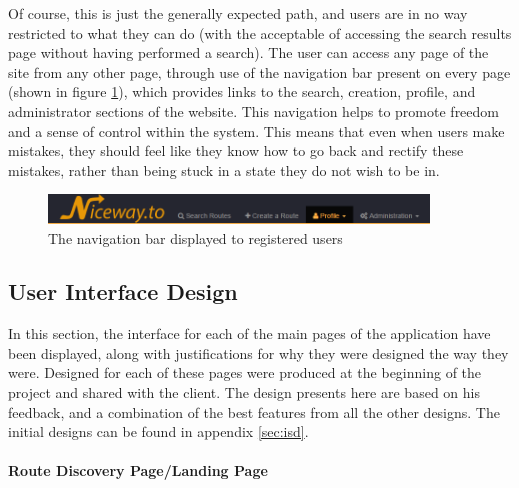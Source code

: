 \noindent
Of course, this is just the generally expected path, and users are in no way restricted to what they can do (with the acceptable of accessing the search results page without having performed a search). The user can access any page of the site from any other page, through use of the navigation bar present on every page (shown in figure \ref{fig:navbar}), which provides links to the search, creation, profile, and administrator sections of the website. This navigation helps to promote freedom and a sense of control within the system. This means that even when users make mistakes, they should feel like they know how to go back and rectify these mistakes, rather than being stuck in a state they do not wish to be in.

\begin{figure}[!ht]
	\begin{center}
		\includegraphics[width=0.9\textwidth]{images/design/navbar.png}
	\end{center}
	\vspace{-6mm}
	\caption{The navigation bar displayed to registered users}
	\label{fig:navbar}
\end{figure}

\subsection{User Interface Design}
In this section, the interface for each of the main pages of the application have been displayed, along with justifications for why they were designed the way they were. Designed for each of these pages were produced at the beginning of the project and shared with the client. The design presents here are based on his feedback, and a combination of the best features from all the other designs. The initial designs can be found in appendix \ref{sec:isd}.

\paragraph{Route Discovery Page/Landing Page}\ \\

